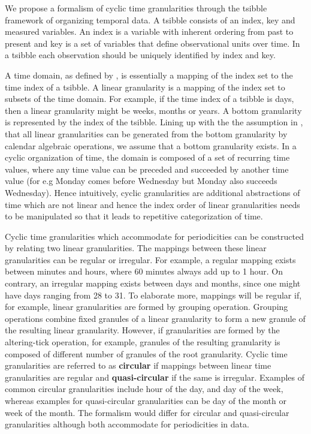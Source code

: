 \documentclass[12pt]{article}
\begin{document}
We propose a formalism of cyclic time granularities through the tsibble \citep{wang2019tsibble} framework of organizing temporal data. A tsibble consists of an index, key and measured variables. An index is a variable with inherent ordering from past to present and key is a set of variables that define observational units over time. In a tsibble each observation should be uniquely identified by index and key.

A time domain, as defined by \citet{Bettini1998-ed}, is essentially a mapping of the index set to the time index of a tsibble. A linear granularity is a mapping of the index set to subsets of the time domain. For example, if the time index of a tsibble is days, then a linear granularity might be weeks, months or years. A bottom granularity is represented by the index of the tsibble. Lining up with the the assumption in \citet{Bettini2000-vy}, that all linear granularities can be generated from the bottom granularity by calendar algebraic operations, we assume that a bottom granularity exists. In a cyclic organization of time, the domain is composed of a set of recurring time values, where any time value can be preceded and succeeded by another time value (for e.g Monday comes before Wednesday but Monday also succeeds Wednesday). Hence intuitively, cyclic granularities are additional abstractions of time which are not linear and hence the index order of linear granularities needs to be manipulated so that it leads to repetitive categorization of time.

Cyclic time granularities which accommodate for periodicities can be constructed by relating two linear granularities. The mappings between these linear granularities can be regular or irregular. For example, a regular mapping exists between minutes and hours, where 60 minutes always add up to 1 hour. On contrary, an irregular mapping exists between days and months, since one might have days ranging from 28 to 31. To elaborate more, mappings will be regular if, for example, linear granularities are formed by grouping operation. Grouping operations combine fixed granules of a linear granularity to form a new granule of the resulting linear granularity. However, if granularities are formed by the altering-tick operation, for example, granules of the resulting granularity is composed of different number of granules of the root granularity. Cyclic time granularities are referred to as \textbf{circular} if mappings between linear time granularities are regular and \textbf{quasi-circular} if the same is irregular. Examples of common circular granularities include hour of the day, and day of the week, whereas examples for quasi-circular granularities can be day of the month or week of the month. The formalism would differ for circular and quasi-circular granularities although both accommodate for periodicities in data.
\end{document}

